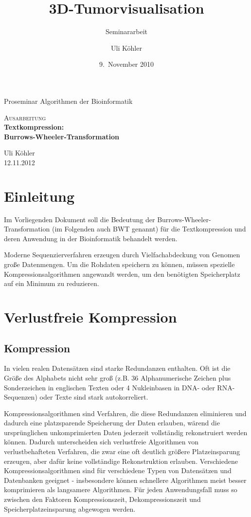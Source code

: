 \documentclass[ngerman,pdftex,paper=A4,DIV=calc,titlepage,12pt]{scrartcl}
\title{3D-Tumorvisualisation}
\subtitle{Seminararbeit}
\author{Uli Köhler}
\date{9.~November 2010}
\newtheorem[L]{boxedDefinition}{Definition}
\begin{document}
\begin{titlepage}
\begin{center}
 Proseminar \glqq Algorithmen der Bioinformatik\grqq
 \end{center}
\vspace{2cm}
\begin{center}
 \large\textsc{Ausarbeitung}\\[5mm]
 {\Huge\centering\bfseries\selectfont Textkompression:\\Burrows-Wheeler-Transformation}\\[2cm]
\begin{center}
  Uli Köhler\\
  12.11.2012
\end{center}
\vspace{2cm}
\end{center}
\tableofcontents
\end{titlepage}
\section{Einleitung}
Im Vorliegenden Dokument soll die Bedeutung der Burrows-Wheeler-Transformation (im Folgenden auch BWT genannt) für die Textkompression und deren Anwendung in der Bioinformatik behandelt werden.

Moderne Sequenzierverfahren erzeugen durch Vielfachabdeckung von Genomen große Datenmengen. Um die Rohdaten speichern zu können, müssen spezielle Kompressionsalgorithmen angewandt werden, um den benötigten Speicherplatz auf ein Minimum zu reduzieren.
\section{Verlustfreie Kompression}
\subsection{ Kompression} \label{ssec:bigdata-bioinformatics}
In vielen realen Datensätzen sind starke Redundanzen enthalten. Oft ist die Größe des Alphabets nicht sehr groß (z.B. 36 Alphanumerische Zeichen plus Sonderzeichen in englischen Texten oder 4 Nukleinbasen in DNA- oder RNA-Sequenzen) oder Texte sind stark autokorreliert.

Kompressionsalgorithmen sind Verfahren, die diese Redundanzen eliminieren und dadurch eine platzsparende Speicherung der Daten erlauben, wärend die ursprünglichen unkomprimierten Daten jederzeit vollständig rekonstruiert werden können.
Dadurch unterscheiden sich verlustfreie Algorithmen von verlustbehafteten Verfahren, die zwar eine oft deutlich größere Platzeinsparung erzeugen, aber dafür keine vollständige Rekonstruktion erlauben.
Verschiedene Kompressionsalgorithmen sind für verschiedene Typen von Datensätzen und Datenbanken geeignet - insbesondere können schnellere Algorithmen meist besser komprimieren als langsamere Algorithmen. Für jeden Anwendungsfall muss so zwischen den Faktoren Kompressionszeit, Dekompressionszeit und Speicherplatzeinsparung abgewogen werden.
\end{document}

